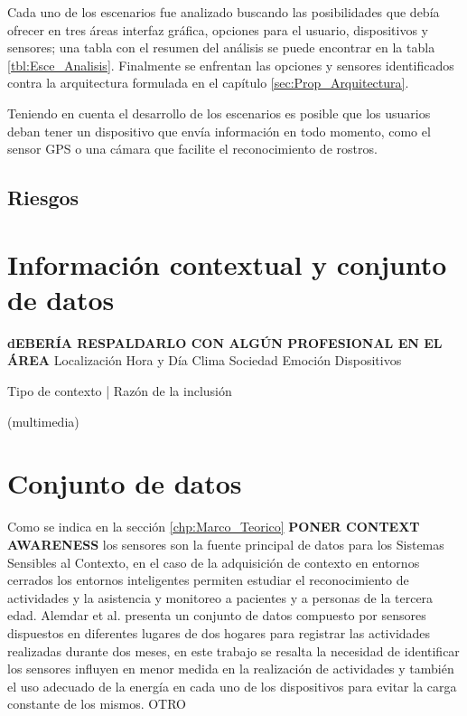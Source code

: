 


Cada uno de los escenarios fue analizado buscando las posibilidades que debía ofrecer en tres áreas interfaz gráfica, opciones para el usuario, dispositivos y sensores; una tabla con el resumen del análisis se puede encontrar en la tabla \ref{tbl:Esce_Analisis}. Finalmente se enfrentan las opciones y sensores identificados contra la arquitectura formulada en el capítulo \ref{sec:Prop_Arquitectura}.

Teniendo en cuenta el desarrollo de los escenarios es posible que los usuarios deban tener un dispositivo que envía información en todo momento, como el sensor GPS o una cámara que facilite el reconocimiento de rostros.

\subsection{Riesgos}\cite{Fargo2014}

\section{Información contextual y conjunto de datos}

\textbf{dEBERÍA RESPALDARLO CON ALGÚN PROFESIONAL EN EL ÁREA}
Localización
Hora y Día
Clima
Sociedad
Emoción
Dispositivos

Tipo de contexto | Razón de la inclusión


(multimedia)

\section{Conjunto de datos}
\label{sec:Prop_Conj_Datos}

Como se indica en la sección \ref{chp:Marco_Teorico} \textbf{PONER CONTEXT AWARENESS} los sensores son la fuente principal de datos para los Sistemas Sensibles al Contexto, en el caso de la adquisición de contexto en entornos cerrados los entornos inteligentes permiten estudiar el reconocimiento de actividades y la asistencia y monitoreo a pacientes y a personas de la tercera edad. Alemdar et al. \cite{Alemdar2013} presenta un conjunto de datos compuesto por sensores dispuestos en diferentes lugares de dos hogares para registrar las actividades realizadas durante dos meses, en este trabajo se resalta la necesidad de identificar los sensores influyen en menor medida en la realización de actividades y también el uso adecuado de la energía en cada uno de los dispositivos para evitar la carga constante de los mismos. OTRO

